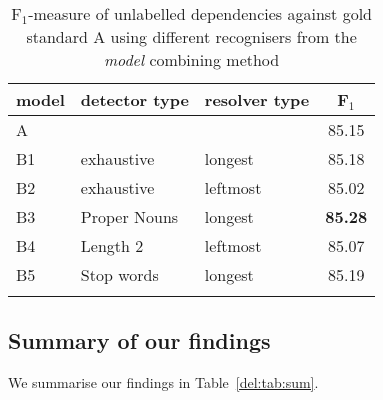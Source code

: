 \documentclass[output=paper]{langsci/langscibook}
\begin{document}
\begin{table}[h]
    \footnotesize
    \def\arraystretch{1.20} 
    \centering
    \begin{tabular}{l l l c} %
      \lsptoprule
        \textnormal{model}
        & \textnormal{detector type}
        & \textnormal{resolver type}
        & \textnormal{F$_1$}
        \\ %
        \midrule
        A &  &  & 85.15\\ \hline
        B1 & exhaustive & longest & 85.18 \\
        B2 & exhaustive & leftmost & 85.02 \\
        B3 & Proper Nouns & longest & \textbf{85.28} \\
        B4 & Length 2 & leftmost & 85.07 \\
        B5 & Stop words & longest & 85.19 \tabularnewline %
        \lspbottomrule
    \end{tabular}
    \caption{F$_1$-measure of unlabelled dependencies against gold standard A using different recognisers from the \textit{model} combining method\label{del:tab:res3}}
\end{table}

\subsection{Summary of our findings}
We summarise our findings in Table~\ref{del:tab:sum}.
\begin{table}[h]
    \footnotesize
    \centering
    \caption{Summary of our findings\label{del:tab:sum}}
\end{table}
\end{document}
